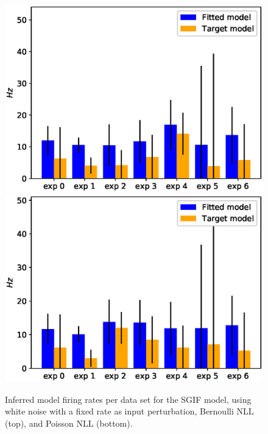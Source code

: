 \documentclass[mphil,deptreport,ianc]{infthesis} %
\begin{document}
\begin{figure}
    \centering
    \vspace{-0.1in}
    \includegraphics[width=0.65\columnwidth]{figures/sleep/approx_rate_across_exp_microGIF_bernoulli_nll_vs_fitted.eps}
    \vspace{-0.1in}
    \includegraphics[width=0.65\columnwidth]{figures/sleep/approx_rate_across_exp_microGIF_poisson_nll_vs_fitted.eps}
    \vspace{-0.1in}
    \caption{Inferred model firing rates per data set for the SGIF model, using white noise with a fixed rate as input perturbation, Bernoulli NLL (top), and Poisson NLL (bottom).}
    \label{fig:approx_rates_sleep_exps_SGIF}
\end{figure}
\end{document}
